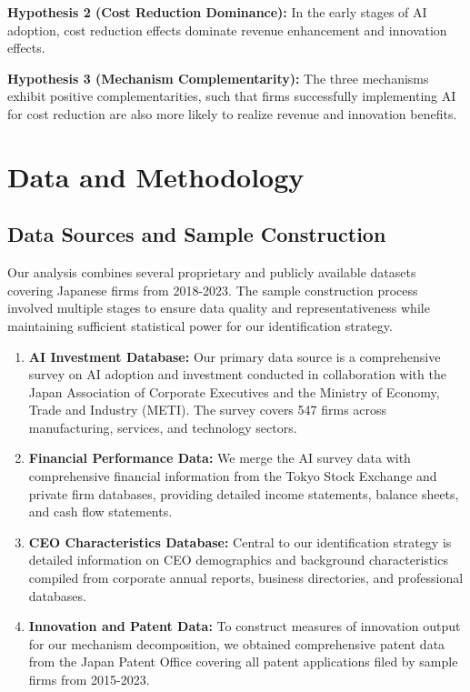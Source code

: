 \documentclass[12pt, a4paper]{article}
\begin{document}
\textbf{Hypothesis 2 (Cost Reduction Dominance):} In the early stages of AI adoption, cost reduction effects dominate revenue enhancement and innovation effects.

\textbf{Hypothesis 3 (Mechanism Complementarity):} The three mechanisms exhibit positive complementarities, such that firms successfully implementing AI for cost reduction are also more likely to realize revenue and innovation benefits.

\section{Data and Methodology}

\subsection{Data Sources and Sample Construction}

Our analysis combines several proprietary and publicly available datasets covering Japanese firms from 2018-2023. The sample construction process involved multiple stages to ensure data quality and representativeness while maintaining sufficient statistical power for our identification strategy.

\begin{enumerate}
\item \textbf{AI Investment Database:} Our primary data source is a comprehensive survey on AI adoption and investment conducted in collaboration with the Japan Association of Corporate Executives and the Ministry of Economy, Trade and Industry (METI). The survey covers 547 firms across manufacturing, services, and technology sectors.

\item \textbf{Financial Performance Data:} We merge the AI survey data with comprehensive financial information from the Tokyo Stock Exchange and private firm databases, providing detailed income statements, balance sheets, and cash flow statements.

\item \textbf{CEO Characteristics Database:} Central to our identification strategy is detailed information on CEO demographics and background characteristics compiled from corporate annual reports, business directories, and professional databases.

\item \textbf{Innovation and Patent Data:} To construct measures of innovation output for our mechanism decomposition, we obtained comprehensive patent data from the Japan Patent Office covering all patent applications filed by sample firms from 2015-2023.
\end{enumerate}
\end{document}

